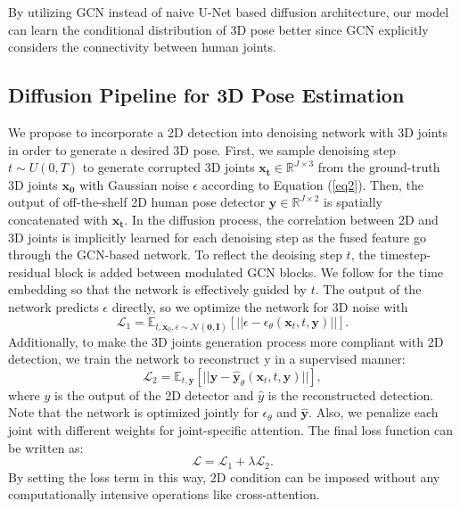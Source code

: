 \documentclass[letterpaper, 10 pt, conference]{ieeeconf}
\begin{document}
By utilizing GCN instead of naive U-Net based diffusion architecture, our model can learn the conditional distribution of 3D pose better since GCN explicitly considers the connectivity between human joints.



\subsection{Diffusion Pipeline for 3D Pose Estimation}
We propose to incorporate a 2D detection into denoising network with 3D joints in order to generate a desired 3D pose.
First, we sample denoising step $t \sim U(0,T)$ to generate corrupted 3D joints $\mathbf{x_t}\in\mathbb{R}^{J\times3}$ from the ground-truth 3D joints $\mathbf{x_0}$ with Gaussian noise $\epsilon$ according to Equation (\ref{eq2}).
Then, the output of off-the-shelf 2D human pose detector $\mathbf{y}\in\mathbb{R}^{J\times2}$ is spatially concatenated with $\mathbf{x_t}$.
In the diffusion process, the correlation between 2D and 3D joints is implicitly learned for each denoising step as the fused feature go through the GCN-based network.
To reflect the deoising step $t$, the timestep-residual block is added between modulated GCN blocks.
We follow \cite{dhariwal2021diffusion} for the time embedding so that the network is effectively guided by $t$.
The output of the network predicts $\epsilon$ directly, so we optimize the network for 3D noise with
\begin{equation}
    \mathcal{L}_1 = \mathbb{E}_{t,\mathbf{x}_{0}, \epsilon \sim \mathcal{N}(\mathbf{0}, \mathbf{I})}[||\epsilon - \epsilon_{\theta}(\mathbf{x}_{t},t, \mathbf{y})||].
\end{equation}
Additionally, to make the 3D joints generation process more compliant with 2D detection, we train the network to reconstruct y in a supervised manner:
\begin{equation}
    \mathcal{L}_2 = \mathbb{E}_{t,\mathbf{y}}[||\mathbf{y} - \hat{\mathbf{y}}_{\theta}(\mathbf{x}_{t},t, \mathbf{y})||],
\end{equation}
where $y$ is the output of the 2D detector and $\hat{y}$ is the reconstructed detection.
Note that the network is optimized jointly for $\epsilon_\theta$ and $\mathbf{\hat{y}}$.
Also, we penalize each joint with different weights for joint-specific attention.
The final loss function can be written as:
\begin{equation}
    \mathcal{L} = \mathcal{L}_1 + \lambda\mathcal{L}_2.
\end{equation}
By setting the loss term in this way, 2D condition can be imposed without any computationally intensive operations like cross-attention.
\end{document}
